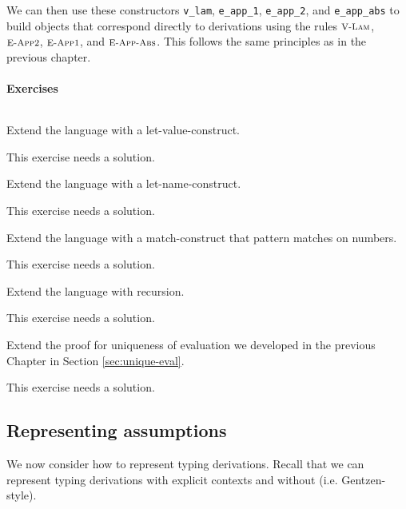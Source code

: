 We can then use these constructors \lstinline!v_lam!, \lstinline!e_app_1!,
\lstinline!e_app_2!, and \lstinline!e_app_abs! to build objects that
correspond directly to derivations using the rules $\textsc{\footnotesize V-Lam}$, $\textsc{\footnotesize E-App2}$,
$\textsc{\footnotesize E-App1}$, and  $\textsc{\footnotesize E-App-Abs}$. This follows the same principles as in the
previous chapter.


\paragraph{Exercises}$\;$\\
\begin{Exercise}
Extend the language with a let-value-construct.
\end{Exercise}
\begin{Answer}
This exercise needs a solution.
\end{Answer}

\begin{Exercise}
Extend the language with a let-name-construct.
\end{Exercise}
\begin{Answer}
This exercise needs a solution.
\end{Answer}

\begin{Exercise}
Extend the language with a match-construct that pattern matches on numbers.
\end{Exercise}
\begin{Answer}
This exercise needs a solution.
\end{Answer}

\begin{Exercise}
Extend the language with recursion.
\end{Exercise}
\begin{Answer}
This exercise needs a solution.
\end{Answer}


\begin{Exercise}
Extend the proof for uniqueness of evaluation we developed in the
previous Chapter in Section \ref{sec:unique-eval}.
\end{Exercise}
\begin{Answer}
This exercise needs a solution.
\end{Answer}

\subsection{Representing assumptions }\label{sec:HOAS-Assumptions}
We now consider how to represent typing derivations. Recall that we can
represent typing derivations with explicit contexts and without
(i.e. Gentzen-style).

